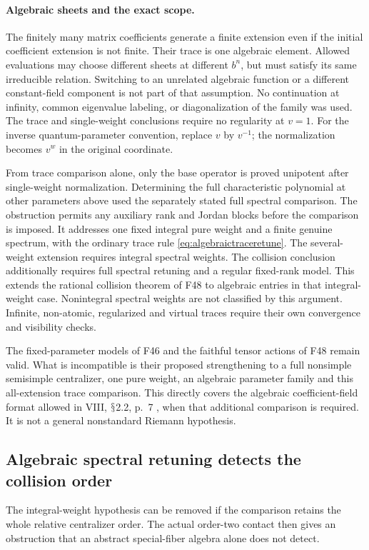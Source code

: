 \documentclass[11pt,a4paper]{article}
\renewcommand{\S}{\ensuremath{\mathsection}}
\newcommand{\fid}[1]{\textsf{#1}}\newcommand{\gate}[1]{\textsf{#1}}
\theoremstyle{named}\newtheorem{finding}{Finding}[section]
\theoremstyle{definition}\newtheorem{definition}[finding]{Definition}
\theoremstyle{remark}\newtheorem{remark}[finding]{Remark}
\begin{document}
\paragraph{Algebraic sheets and the exact scope.}
The finitely many matrix coefficients generate a finite
extension even if the initial coefficient extension is
not finite. Their trace is one algebraic element.
Allowed evaluations may choose different sheets at
different $b^n$, but must satisfy its same irreducible
relation. Switching to an unrelated algebraic function
or a different constant-field component is not part
of that assumption.
No continuation at infinity, common eigenvalue labeling,
or diagonalization of the family was used.
The trace and single-weight conclusions require no
regularity at $v=1$.
For the inverse quantum-parameter convention, replace
$v$ by $v^{-1}$; the normalization becomes $v^w$
in the original coordinate.

From trace comparison alone, only the base operator
is proved unipotent after single-weight normalization.
Determining the full characteristic polynomial at
other parameters above used the separately stated
full spectral comparison.
The obstruction permits any auxiliary rank and Jordan
blocks before the comparison is imposed.
It addresses one fixed integral pure weight and a
finite genuine spectrum, with the ordinary trace
rule \eqref{eq:algebraictraceretune}.
The several-weight extension requires integral spectral
weights. The collision conclusion additionally requires
full spectral retuning and a regular fixed-rank model.
This extends the rational collision theorem of
\fid{F48} to algebraic entries in that integral-weight
case. Nonintegral spectral weights are not classified
by this argument.
Infinite, non-atomic, regularized and virtual traces
require their own convergence and visibility checks.

The fixed-parameter models of \fid{F46} and the
faithful tensor actions of \fid{F48} remain valid.
What is incompatible is their proposed strengthening
to a full nonsimple semisimple centralizer, one pure
weight, an algebraic parameter family and this
all-extension trace comparison.
This directly covers the algebraic coefficient-field
format allowed in VIII, \S2.2, p.~7 \cite{VIII},
when that additional comparison is required.
It is not a general nonstandard Riemann hypothesis.

\subsection{Algebraic spectral retuning detects the collision order}
The integral-weight hypothesis can be removed if the comparison
retains the whole relative centralizer order. The actual
order-two contact then gives an obstruction that an abstract
special-fiber algebra alone does not detect.
\end{document}
